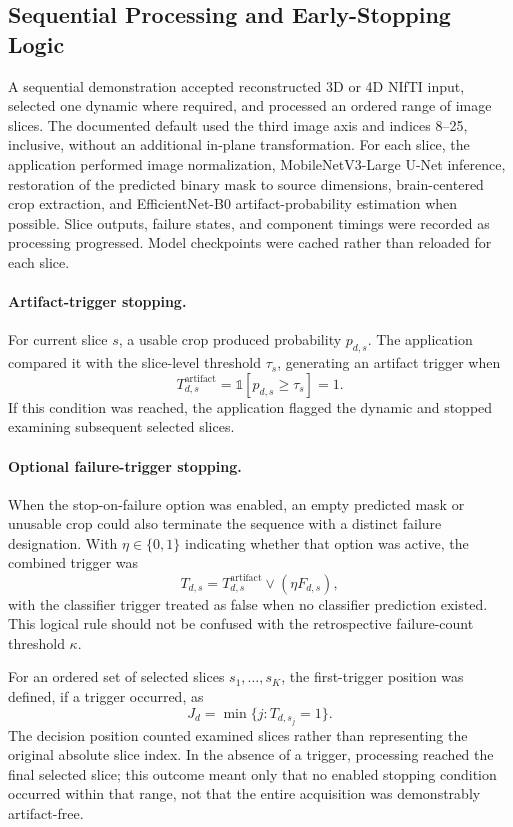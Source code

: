 \subsection{Sequential Processing and Early-Stopping Logic}
\label{subsec:2d_sequential_stopping}

A sequential demonstration accepted reconstructed 3D or 4D NIfTI input, selected one dynamic where required, and processed an ordered range of image slices. The documented default used the third image axis and indices 8--25, inclusive, without an additional in-plane transformation. For each slice, the application performed image normalization, MobileNetV3-Large U-Net inference, restoration of the predicted binary mask to source dimensions, brain-centered crop extraction, and EfficientNet-B0 artifact-probability estimation when possible. Slice outputs, failure states, and component timings were recorded as processing progressed. Model checkpoints were cached rather than reloaded for each slice.

\paragraph{Artifact-trigger stopping.}
For current slice $s$, a usable crop produced probability $p_{d,s}$. The application compared it with the slice-level threshold $\tau_s$, generating an artifact trigger when
\begin{equation}
T_{d,s}^{\mathrm{artifact}}=\mathbb{1}[p_{d,s}\geq\tau_s]=1.
\end{equation}
If this condition was reached, the application flagged the dynamic and stopped examining subsequent selected slices.

\paragraph{Optional failure-trigger stopping.}
When the stop-on-failure option was enabled, an empty predicted mask or unusable crop could also terminate the sequence with a distinct failure designation. With $\eta\in\{0,1\}$ indicating whether that option was active, the combined trigger was
\begin{equation}
T_{d,s}=T_{d,s}^{\mathrm{artifact}}\lor(\eta F_{d,s}),
\end{equation}
with the classifier trigger treated as false when no classifier prediction existed. This logical rule should not be confused with the retrospective failure-count threshold $\kappa$.

For an ordered set of selected slices $s_1,\ldots,s_K$, the first-trigger position was defined, if a trigger occurred, as
\begin{equation}
J_d=\min\{j:T_{d,s_j}=1\}.
\end{equation}
The decision position counted examined slices rather than representing the original absolute slice index. In the absence of a trigger, processing reached the final selected slice; this outcome meant only that no enabled stopping condition occurred within that range, not that the entire acquisition was demonstrably artifact-free.

